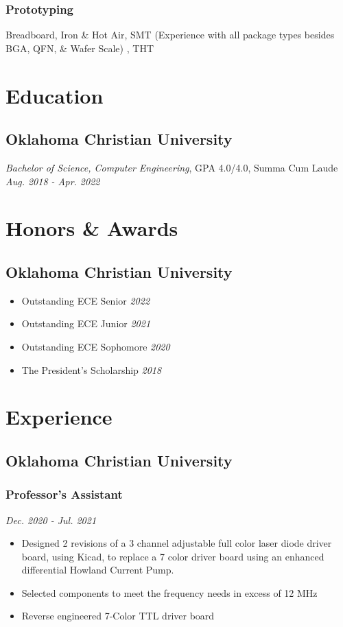 \documentclass{article}
\begin{document}
\begin{spacing}{.5}
		\subsubsection{Prototyping} \large{Breadboard, Iron \& Hot Air, SMT} \small{(Experience with all package types besides BGA, QFN, \& Wafer Scale)} \large{, THT}

\section{Education}
	\subsection{Oklahoma Christian University}
		\textit{Bachelor of Science, Computer Engineering}, GPA 4.0/4.0, Summa Cum Laude \hfill \small{\textsl{Aug. 2018 - Apr. 2022}}

\section{Honors \& Awards}
	\subsection{Oklahoma Christian University}
		\begin{itemize}[label=$\bullet$,itemsep=-.75ex]
			\item \large{Outstanding ECE Senior} \hfill \small{\textsl{2022}}
			\item \large{Outstanding ECE Junior} \hfill \small{\textsl{2021}}
			\item \large{Outstanding ECE Sophomore} \hfill \small{\textsl{2020}}
			\item \large{The President's Scholarship} \hfill \small{\textsl{2018}}
		\end{itemize}
\section{Experience}
	\subsection{Oklahoma Christian University}
		\subsubsection{\large{Professor's Assistant}} \hfill \small{\textsl{Dec. 2020 - Jul. 2021}}
			\begin{itemize}[label=--,itemsep=-.65ex]
				\item \large{Designed 2 revisions of a 3 channel adjustable full color laser diode driver board, using Kicad, to replace a 7 color driver board using an enhanced differential Howland Current Pump.}
				\item \large{Selected components to meet the frequency needs in excess of 12 MHz}
				\item \large{Reverse engineered 7-Color TTL driver board}
			\end{itemize}

\end{spacing}
\end{document}
